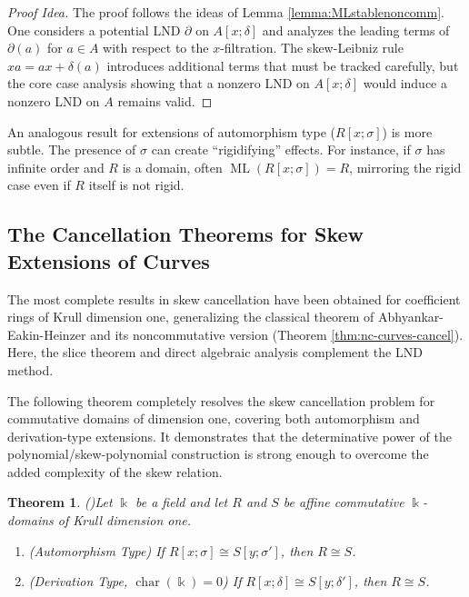 \documentclass{amsart}
\theoremstyle{plain}
\newtheorem{theorem}{Theorem}
\numberwithin{theorem}{section}
\numberwithin{equation}{theorem}
\theoremstyle{definition}
\DeclareMathOperator{\ML}{ML}
\begin{document}
\begin{proof}[Proof Idea]
The proof follows the ideas of Lemma \ref{lemma:MLstablenoncomm}. One considers a potential LND $\partial$ on $A[x;\delta]$ and analyzes the leading terms of $\partial(a)$ for $a \in A$ with respect to the $x$-filtration. The skew-Leibniz rule $x a = a x + \delta(a)$ introduces additional terms that must be tracked carefully, but the core case analysis showing that a nonzero LND on $A[x;\delta]$ would induce a nonzero LND on $A$ remains valid.
\end{proof}

An analogous result for extensions of automorphism type ($R[x;\sigma]$) is more subtle. The presence of $\sigma$ can create ``rigidifying'' effects. For instance, if $\sigma$ has infinite order and $R$ is a domain, often $\ML(R[x;\sigma]) = R$, mirroring the rigid case even if $R$ itself is not rigid.

\subsection{The Cancellation Theorems for Skew Extensions of Curves}

The most complete results in skew cancellation have been obtained for coefficient rings of Krull dimension one, generalizing the classical theorem of Abhyankar-Eakin-Heinzer and its noncommutative version (Theorem \ref{thm:nc-curves-cancel}). Here, the slice theorem and direct algebraic analysis complement the LND method.

The following theorem completely resolves the skew cancellation problem for commutative domains of dimension one, covering both automorphism and derivation-type extensions. It demonstrates that the determinative power of the polynomial/skew-polynomial construction is strong enough to overcome the added complexity of the skew relation.

\begin{theorem}(\cite[Propositions 5.2 and 5.6]{BHHV})\label{thm:skew-curves-comm}
Let $\Bbbk$ be a field and let $R$ and $S$ be affine commutative $\Bbbk$-domains of Krull dimension one.
\begin{enumerate}
    \item (Automorphism Type) If $R[x;\sigma] \cong S[y;\sigma']$, then $R \cong S$.
    \item (Derivation Type, $\operatorname{char}(\Bbbk)=0$) If $R[x;\delta] \cong S[y;\delta']$, then $R \cong S$.
\end{enumerate}
\end{theorem}
\end{document}
